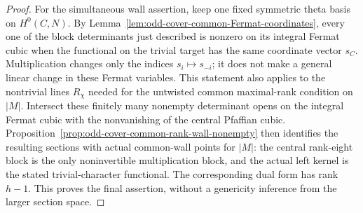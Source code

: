 \begin{proof}
For the simultaneous wall assertion, keep one fixed symmetric
theta basis on \(H^0(C,N)\). By
Lemma~\ref{lem:odd-cover-common-Fermat-coordinates}, every one of
the block determinants just described is nonzero on its integral
Fermat cubic when the functional on the trivial target has the
same coordinate vector \(s_C\). Multiplication changes only the
indices \(s_i\mapsto s_{-i}\); it does not make a general linear
change in these Fermat variables. This statement also applies to
the nontrivial lines \(R_\chi\) needed for the untwisted common
maximal-rank condition on \(|M|\).
Intersect these finitely many nonempty determinant opens on the
integral Fermat cubic with the nonvanishing of the central Pfaffian
cubic. Proposition~\ref{prop:odd-cover-common-rank-wall-nonempty}
then identifies the resulting sections with actual common-wall
points for \(|M|\): the central rank-eight block is the only
noninvertible multiplication block, and the actual left kernel
is the stated trivial-character functional. The corresponding
dual form has rank \(h-1\). This proves the final assertion,
without a genericity inference from the larger section space.
\end{proof}

